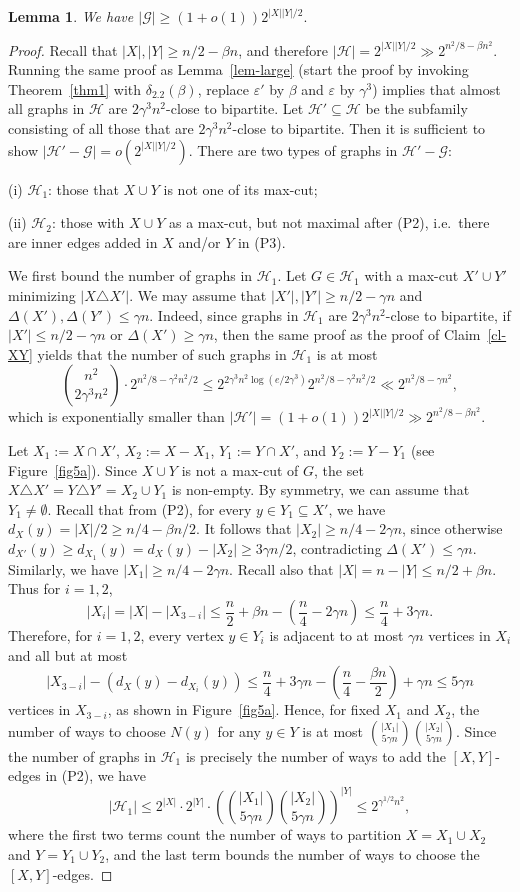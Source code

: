 \documentclass[12pt]{article}
\newtheorem{lemma}[theorem]{Lemma}
\theoremstyle{definition}
\theoremstyle{definition}
\theoremstyle{definition}
\theoremstyle{definition}
\theoremstyle{definition}
\theoremstyle{definition}
\theoremstyle{definition}
\newcommand{\ep}{\varepsilon}
\newcommand{\de}{\delta}
\newcommand{\ga}{\gamma}
\newcommand{\De}{\Delta}
\newcommand{\cH}{\mathcal{H}}
\newcommand{\cG}{\mathcal{G}}
\newcommand{\3}{\bf{3}}
\newcommand{\setm}{-}
\begin{document}
\begin{lemma}\label{claim-g}
We have $|\cG|\ge (1+o(1))2^{|X||Y|/2}.$
\end{lemma}
\begin{proof}
Recall that $|X|,|Y|\ge n/2-\beta n$, and therefore $|\cH|= 2^{|X||Y|/2}\gg 2^{n^2/8-\beta n^2}$. Running the same proof as Lemma~\ref{lem-large} (start the proof by invoking Theorem~\ref{thm1} with $\de_{2.2}(\beta)$, replace $\ep'$ by $\beta$ and $\ep$ by $\ga^3$) implies that almost all graphs in $\cH$ are $2\ga^3 n^2$-close to bipartite. Let $\cH'\subseteq \cH$ be the subfamily consisting of all those that are $2\ga^3 n^2$-close to bipartite. Then it is sufficient to show $|\cH'\setm \cG|=o(2^{|X||Y|/2})$. There are two types of graphs in $\cH'\setm\cG$: 

(i) $\cH_1$: those that $X\cup Y$ is not one of its max-cut;

(ii) $\cH_2$: those with $X\cup Y$ as a max-cut, but not maximal after (P2), i.e.~there are inner edges added in $X$ and/or $Y$ in (P3).

We first bound the number of graphs in $\cH_1$. Let $G\in\cH_1$ with a max-cut $X'\cup Y'$ minimizing $|X\triangle X'|$. We may assume that $|X'|,|Y'|\ge n/2-\ga n$ and $\De(X'),\De(Y')\le \ga n$. Indeed, since graphs in $\cH_1$ are $2\ga^3n^2$-close to bipartite, if $|X'|\le n/2-\ga n$ or $\De(X')\ge \ga n$, then the same proof as the proof of Claim~\ref{cl-XY} yields that the number of such graphs in $\cH_1$ is at most 
$${n^2\choose 2\ga^3n^2}\cdot2^{n^2/8-\ga^2n^2/2}\le 2^{2\ga^3n^2\log(e/2\ga^3)}2^{n^2/8-\ga^2n^2/2}\ll 2^{n^2/8-\ga n^2},$$ 
which is exponentially smaller than $|\cH'|=(1+o(1))2^{|X||Y|/2}\gg 2^{n^2/8-\beta n^2}$.


Let $X_1:=X\cap X'$, $X_2:=X\setm X_1$, $Y_1:=Y\cap X'$, and $Y_2:=Y\setm Y_1$ (see Figure~\ref{fig5a}). Since $X\cup Y$ is not a max-cut of $G$, the set $X\triangle X'=Y\triangle Y'=X_2\cup Y_1$ is non-empty. By symmetry, we can assume that $Y_1\ne\emptyset$. Recall that from (P2), for every $y\in Y_1\subseteq X'$, we have $d_X(y)=|X|/2\ge n/4-\beta n/2$. It follows that $|X_2|\ge n/4-2\ga n$, since otherwise $d_{X'}(y)\ge d_{X_1}(y)=d_{X}(y)-|X_2|\ge 3\ga  n/2$, contradicting $\De(X')\le \ga n$. Similarly, we have $|X_1|\ge n/4-2\ga n$. Recall also that $|X|=n-|Y|\le n/2+\beta n$. Thus for $i=1,2$, 
$$|X_i|=|X|-|X_{3-i}|\le \frac{n}{2}+\beta n-\left(\frac{n}{4}-2\ga n\right)\le \frac{n}{4}+3\ga n.$$
Therefore, for $i=1,2$, every vertex $y\in Y_i$ is adjacent to at most $\ga n$ vertices in $X_i$ and all but at most 
$$|X_{3-i}|-(d_X(y)-d_{X_i}(y))\le \frac{n}{4}+3\ga n-\left(\frac{n}{4}-\frac{\beta n}{2}\right)+\ga n\le 5\ga n$$ 
vertices in $X_{3-i}$, as shown in Figure~\ref{fig5a}. Hence, for fixed $X_1$ and $X_2$, the number of ways to choose $N(y)$ for any $y\in Y$ is at most ${|X_1|\choose 5\ga n}{|X_2|\choose 5\ga n}$. Since the number of graphs in $\cH_1$ is precisely the number of ways to add the $[X,Y]$-edges in (P2), we have 
$$|\cH_1|\le 2^{|X|}\cdot 2^{|Y|}\cdot \left({|X_1|\choose 5\ga n}{|X_2|\choose 5\ga n}\right)^{|Y|}\le 2^{\ga^{1/2}n^2},$$
where the first two terms count the number of ways to partition $X=X_1\cup X_2$ and $Y=Y_1\cup Y_2$, and the last term bounds the number of ways to choose the $[X,Y]$-edges.


\end{proof}
\end{document}
